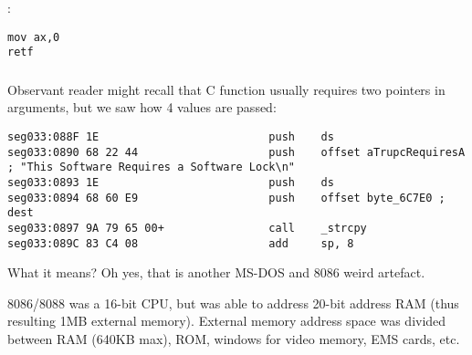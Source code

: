 :

\begin{lstlisting}
mov ax,0
retf
\end{lstlisting}

\subsubsection{}

\label{dos_memory_model}
{Observant reader might recall that  C function usually requires two pointers in arguments,
but we saw how 4 values are passed}:

\begin{lstlisting}
seg033:088F 1E                          push    ds
seg033:0890 68 22 44                    push    offset aTrupcRequiresA ; "This Software Requires a Software Lock\n"
seg033:0893 1E                          push    ds
seg033:0894 68 60 E9                    push    offset byte_6C7E0 ; dest
seg033:0897 9A 79 65 00+                call    _strcpy
seg033:089C 83 C4 08                    add     sp, 8
\end{lstlisting}

{What it means? Oh yes, that is another MS-DOS and 8086 weird artefact}.

8086/8088 
{was a 16-bit CPU, but was able to address 20-bit address RAM 
(thus resulting 1MB external memory)}.
{External memory address space was divided between \ac{RAM} (640KB max),
\ac{ROM}, windows for video memory, EMS cards, etc}.

